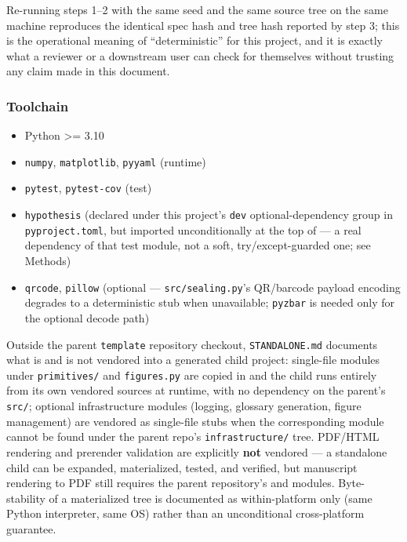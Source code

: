 \documentclass[
]{article}
\providecommand{\tightlist}{%
  \setlength{\itemsep}{0pt}\setlength{\parskip}{0pt}}
\begin{document}
Re-running steps 1--2 with the same seed and the same source tree on the
same machine reproduces the identical spec hash and tree hash reported
by step 3; this is the operational meaning of ``deterministic'' for this
project, and it is exactly what a reviewer or a downstream user can
check for themselves without trusting any claim made in this document.

\subsubsection{Toolchain}\label{toolchain}

\begin{itemize}
\tightlist
\item
  Python \texorpdfstring{\textgreater{}=}{>=} 3.10
\item
  \texttt{numpy}, \texttt{matplotlib}, \texttt{pyyaml} (runtime)
\item
  \texttt{pytest}, \texttt{pytest-cov} (test)
\item
  \texttt{hypothesis}
  \citep{claessen2000quickcheck, maciver2019hypothesis} (declared under
  this project's \texttt{dev} optional-dependency group in
  \texttt{pyproject.toml}, but imported unconditionally at the top of
   --- a real dependency of that
  test module, not a soft, try/except-guarded one; see Methods)
\item
  \texttt{qrcode}, \texttt{pillow} (optional ---
  \texttt{src/sealing.py}'s QR/barcode payload encoding degrades to a
  deterministic stub when unavailable; \texttt{pyzbar} is needed only
  for the optional decode path)
\end{itemize}

Outside the parent \texttt{template} repository checkout,
\texttt{STANDALONE.md} documents what is and is not vendored into a
generated child project: single-file modules under \texttt{primitives/}
and \texttt{figures.py} are copied in and the child runs entirely from
its own vendored sources at runtime, with no dependency on the parent's
\texttt{src/}; optional infrastructure modules (logging, glossary
generation, figure management) are vendored as single-file stubs when
the corresponding module cannot be found under the parent repo's
\texttt{infrastructure/} tree. PDF/HTML rendering and prerender
validation are explicitly \textbf{not} vendored --- a standalone child
can be expanded, materialized, tested, and verified, but manuscript
rendering to PDF still requires the parent repository's
 and 
modules. Byte-stability of a materialized tree is documented as
within-platform only (same Python interpreter, same OS) rather than an
unconditional cross-platform guarantee.
\end{document}
